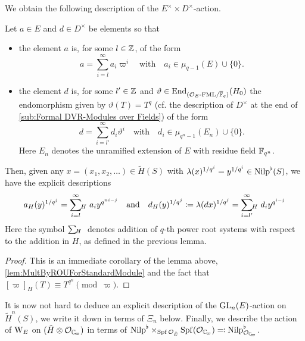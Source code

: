 \documentclass[../main.tex]{subfiles}
\begin{document}
We obtain the following description of the $E^\times \times D^\times$-action.

\begin{cor}\label{cor:ExplicitDescriptionOfActionOnUnivCov}
  Let $a \in E$ and $d \in D^\times$ be elements so that
  \begin{itemize}
    \item the element $a$ is, for some $l \in \mathbb{Z}$, of the form
      \begin{equation*}
        a = \sum_{i = l}^\infty a_i \varpi^i \quad \text{with} \quad
        a_i \in \mu_{q-1}(E) \cup \{0\}.
      \end{equation*}
    \item the element $d$ is, for some $l' \in \mathbb{Z}$ and 
      $\vartheta \in \operatorname{End}_{{({\mathcal{O}_E}\textnormal-\allowbreak\mathrm{FML}/{{\overline {\mathbb{F}}_q}})}} (H_0)$ the endomorphism given
      by $\vartheta(T) = T^q$ (cf. the description of $D^\times$ at the 
      end of \cref{sub:Formal DVR-Modules over Fields}) of the form
      \begin{equation*}
        d = \sum_{i = l'}^\infty d_i \vartheta^i \quad \text{with} \quad
        d_i \in \mu_{q^n-1}(E_n) \cup \{0\}.
      \end{equation*}
      Here $E_n$ denotes the unramified extension of $E$ with residue field 
      $\mathbb{F}_{q^n}$. 
  \end{itemize}
  Then, given any $x = (x_1, x_2, \dots)
  \in \tilde H(S)$ with $\lambda(x)^{1/q^i} = y^{1/q^i} \in {\mathrm{Nilp}}^\flat(S)$, we
  have the explicit descriptions
  \begin{equation*}
    a_H(y)^{1/q^j}  = \sum_{i=l}^\infty{\hspace{-3pt}}_H\hspace{3pt} a_i y^{q^{ni-j}}
  \quad \text{and} \quad
  d_H(y)^{1/q^j} \coloneqq \lambda(dx)^{1/q^j} = \sum_{i=l'}^\infty {\hspace{-3pt}}_H\hspace{3pt} d_i y^{q^{i-j}}
  \end{equation*}
  Here the symbol $\sum {\hspace{-3pt}}_H\hspace{3pt}$ \hspace{-10pt} denotes addition of $q$-th power
  root systems with
  respect to the addition in $H$, as defined in the previous lemma.
  \begin{proof}
    This is an immediate corollary of the lemma above, 
    \cref{lem:MultByROUForStandardModule} and the fact that 
    $[\varpi]_H(T) \equiv T^{q^n} \pmod \varpi$. 
  \end{proof}
\end{cor}

It is now not hard to deduce an explicit description of the $\operatorname{GL}_n(E)$-action
on $\tilde H^n(S)$, we write it down in terms of $\Xi_n$ below. Finally, we
describe the action of $\mathrm W_E$ on $(\tilde H \otimes \cO_\Cp)$ in terms
of $\Nilp^\flat \times_{\spf \cO_\br E} \Spf(\cO_\Cp) \eqcolon \Nilp^\flat_{\cO_\Cp}$.
\end{document}
